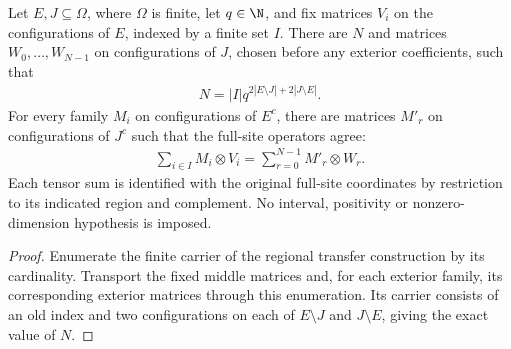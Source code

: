 \begin{lemma}
    \label{thm:changing_regional_family_fin}
    \leanok
    Let $E,J\subseteq\Omega$, where $\Omega$ is finite, let $q\in\N$, and
    fix matrices $V_i$ on the configurations of $E$, indexed by a finite set
    $I$. There are $N$ and matrices $W_0,\ldots,W_{N-1}$ on configurations
    of $J$, chosen before any exterior coefficients, such that
    \begin{align}
        N=|I|q^{2|E\setminus J|+2|J\setminus E|}.
    \end{align}
    For every family $M_i$ on configurations of $E^c$, there are matrices
    $M'_r$ on configurations of $J^c$ such that the full-site operators agree:
    \begin{align}
        \sum_{i\in I}M_i\otimes V_i=\sum_{r=0}^{N-1}M'_r\otimes W_r.
    \end{align}
    Each tensor sum is identified with the original full-site coordinates
    by restriction to its indicated region and complement. No interval,
    positivity or nonzero-dimension hypothesis is imposed.
\end{lemma}
\begin{proof}
    \leanok
    Enumerate the finite carrier of the regional transfer construction by
    its cardinality. Transport the fixed middle matrices and, for each
    exterior family, its corresponding exterior matrices through this
    enumeration. Its carrier consists of an old index and two configurations
    on each of $E\setminus J$ and $J\setminus E$, giving the exact value of $N$.
\end{proof}
